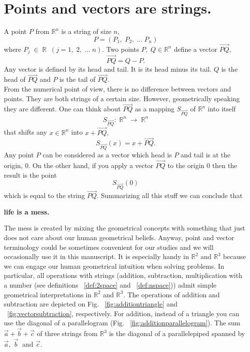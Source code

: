 \documentclass[color=black,11pt]{elegantpaper}
\begin{document}
\section{Points and vectors are strings.}
A point $P$ from $\mathbb{R}^n$ is a string of size $n,$
$$
P=(P_1,\;P_2,\;\dots\; P_n)
$$ 
where $P_j\;\in\; \mathbb{R}\;\;(j=1,\;2,\; \dots \; n).$ Two points $P,\;Q\in \mathbb{R}^n$ define a vector $\overrightarrow{PQ},$
$$
\overrightarrow{PQ} = Q - P.
$$
 Any vector is defined by its head and tail. It is its head minus its tail. $Q$ is the head of $\overrightarrow{PQ}$ and $P$ is the tail of $\overrightarrow{PQ}.$\\
From the numerical point of view, there is no difference between vectors and points. They are both strings of a certain size. However, geometrically speaking they are different. One can think about  $\overrightarrow{PQ}$ as a mapping $S_{\overrightarrow{PQ}}$ of $\mathbb{R}^n$ into itself
$$
S_{\overrightarrow{PQ}}:\;\mathbb{R}^n \; \to\;\mathbb{R}^n
$$
 that shifts any $x\in\mathbb{R}^n$ into $x + \overrightarrow{PQ},$
$$   
S_{\overrightarrow{PQ}}(x) = x + \overrightarrow{PQ}.
$$
Any point $P$ can be considered as a vector which head is $P$ and tail is at the origin, $0.$ On the other hand, if you apply a vector $\overrightarrow{PQ}$ to the origin $0$ then the result is the point 
$$
S_{\overrightarrow{PQ}}(0)
$$
which is equal to the string $\overrightarrow{PQ}.$ Summarizing all this stuff  we can conclude that\\
\begin{center}
{\bf life is a mess.} 
\end{center}
The mess is created by mixing the geometrical concepts with something that just does not care about our human geometrical beliefs. Anyway, point and vector terminology could be sometimes convenient for our studies and we will occasionally use it in this manuscript. It is especially handy in $\mathbb{R}^2$ and $\mathbb{R}^3$ because we can engage our human geometrical intuition when solving  problems. In particular, all operations with strings (addition, subtraction, multiplication with a number (see definitions ~\ref{def:2space} and  ~\ref{def:nspace})) admit simple geometrical interpretations in $\mathbb{R}^2$ and $\mathbb{R}^3.$   The operations of addition and subtraction are depicted on Fig. ~\ref{fig:additiontriangle} and ~\ref{fig:vectorsubtraction}, respectively. For addition, instead of a triangle you can use the diagonal of a parallelogram (Fig. ~\ref{fig:additionparallelogram}). The sum $\vec{a}+\vec{b}+\vec{c}$  of three strings from $\mathbb{R}^3$ is the diagonal of a parallelepiped spanned by $\vec{a},\; \vec{b}\;$ and $\vec{c}.$
\end{document}
